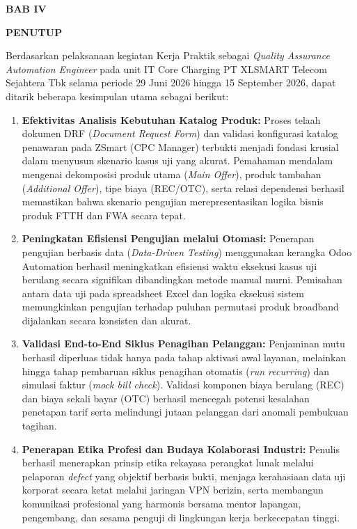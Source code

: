 \documentclass[12pt,a4paper]{article}
\begin{document}
\clearpage
\begin{center}
    {\bfseries\large BAB IV\par}
    {\bfseries\large PENUTUP\par}
\end{center}
\vspace{0.4cm}

Berdasarkan pelaksanaan kegiatan Kerja Praktik sebagai \textit{Quality Assurance Automation Engineer} pada unit IT Core Charging PT XLSMART Telecom Sejahtera Tbk selama periode 29 Juni 2026 hingga 15 September 2026, dapat ditarik beberapa kesimpulan utama sebagai berikut:
\begin{enumerate}[label=\arabic*.,leftmargin=1.5em,itemsep=3pt,topsep=2pt]
    \item \textbf{Efektivitas Analisis Kebutuhan Katalog Produk:} Proses telaah dokumen DRF (\textit{Document Request Form}) dan validasi konfigurasi katalog penawaran pada ZSmart (CPC Manager) terbukti menjadi fondasi krusial dalam menyusun skenario kasus uji yang akurat. Pemahaman mendalam mengenai dekomposisi produk utama (\textit{Main Offer}), produk tambahan (\textit{Additional Offer}), tipe biaya (REC/OTC), serta relasi dependensi berhasil memastikan bahwa skenario pengujian merepresentasikan logika bisnis produk FTTH dan FWA secara tepat.
    \item \textbf{Peningkatan Efisiensi Pengujian melalui Otomasi:} Penerapan pengujian berbasis data (\textit{Data-Driven Testing}) menggunakan kerangka Odoo Automation berhasil meningkatkan efisiensi waktu eksekusi kasus uji berulang secara signifikan dibandingkan metode manual murni. Pemisahan antara data uji pada spreadsheet Excel dan logika eksekusi sistem memungkinkan pengujian terhadap puluhan permutasi produk broadband dijalankan secara konsisten dan akurat.
    \item \textbf{Validasi End-to-End Siklus Penagihan Pelanggan:} Penjaminan mutu berhasil diperluas tidak hanya pada tahap aktivasi awal layanan, melainkan hingga tahap pembaruan siklus penagihan otomatis (\textit{run recurring}) dan simulasi faktur (\textit{mock bill check}). Validasi komponen biaya berulang (REC) dan biaya sekali bayar (OTC) berhasil mencegah potensi kesalahan penetapan tarif serta melindungi jutaan pelanggan dari anomali pembukuan tagihan.
    \item \textbf{Penerapan Etika Profesi dan Budaya Kolaborasi Industri:} Penulis berhasil menerapkan prinsip etika rekayasa perangkat lunak melalui pelaporan \textit{defect} yang objektif berbasis bukti, menjaga kerahasiaan data uji korporat secara ketat melalui jaringan VPN berizin, serta membangun komunikasi profesional yang harmonis bersama mentor lapangan, pengembang, dan sesama penguji di lingkungan kerja berkecepatan tinggi.

\end{enumerate}
\end{document}
